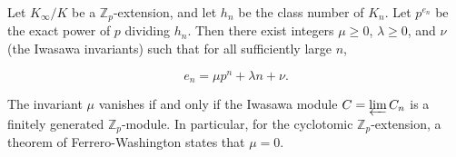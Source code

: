 Let $K_\infty / K$ be a $\mathbb{Z}_p$-extension, and let $h_n$ be the class number of $K_n$. Let $p^{e_n}$ be the exact power of $p$ dividing $h_n$. Then there exist integers $\mu \geq 0$, $\lambda \geq 0$, and $\nu$ (the Iwasawa invariants) such that for all sufficiently large $n$,

$$e_n = \mu p^n + \lambda n + \nu.$$

The invariant $\mu$ vanishes if and only if the Iwasawa module $C = \varprojlim C_n$ is a finitely generated $\mathbb{Z}_p$-module. In particular, for the cyclotomic $\mathbb{Z}_p$-extension, a theorem of Ferrero-Washington states that $\mu = 0$.
